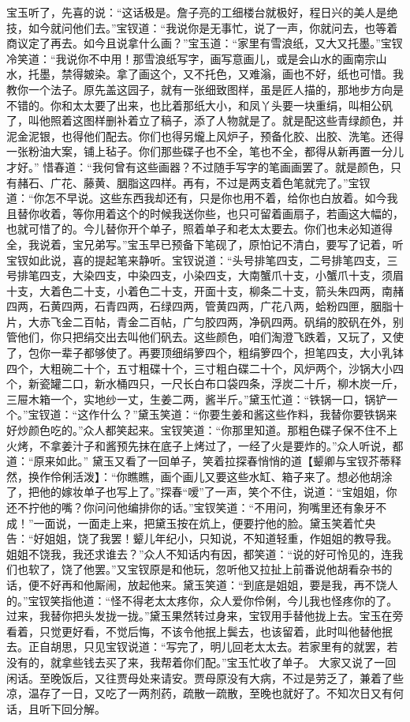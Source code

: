 \documentclass[12pt,oneside]{book}
\begin{document}
宝玉听了，先喜的说：“这话极是。詹子亮的工细楼台就极好，程日兴的美人是绝技，如今就问他们去。”宝钗道：“我说你是无事忙，说了一声，你就问去，也等着商议定了再去。如今且说拿什么画？”宝玉道：“家里有雪浪纸，又大又托墨。”宝钗冷笑道：“我说你不中用！那雪浪纸写字，画写意画儿，或是会山水的画南宗山水，托墨，禁得皴染。拿了画这个，又不托色，又难滃，画也不好，纸也可惜。我教你一个法子。原先盖这园子，就有一张细致图样，虽是匠人描的，那地步方向是不错的。你和太太要了出来，也比着那纸大小，和凤丫头要一块重绢，叫相公矾了，叫他照着这图样删补着立了稿子，添了人物就是了。就是配这些青绿颜色，并泥金泥银，也得他们配去。你们也得另爖上风炉子，预备化胶、出胶、洗笔。还得一张粉油大案，铺上毡子。你们那些碟子也不全，笔也不全，都得从新再置一分儿才好。”
惜春道：“我何曾有这些画器？不过随手写字的笔画画罢了。就是颜色，只有赭石、广花、藤黄、胭脂这四样。再有，不过是两支着色笔就完了。”宝钗道：“你怎不早说。这些东西我却还有，只是你也用不着，给你也白放着。如今我且替你收着，等你用着这个的时候我送你些，也只可留着画扇子，若画这大幅的，也就可惜了的。今儿替你开个单子，照着单子和老太太要去。你们也未必知道得全，我说着，宝兄弟写。”宝玉早已预备下笔砚了，原怕记不清白，要写了记着，听宝钗如此说，喜的提起笔来静听。宝钗说道：“头号排笔四支，二号排笔四支，三号排笔四支，大染四支，中染四支，小染四支，大南蟹爪十支，小蟹爪十支，须眉十支，大着色二十支，小着色二十支，开面十支，柳条二十支，箭头朱四两，南赭四两，石黄四两，石青四两，石绿四两，管黄四两，广花八两，蛤粉四匣，胭脂十片，大赤飞金二百帖，青金二百帖，广匀胶四两，净矾四两。矾绢的胶矾在外，别管他们，你只把绢交出去叫他们矾去。这些颜色，咱们淘澄飞跌着，又玩了，又使了，包你一辈子都够使了。再要顶细绢箩四个，粗绢箩四个，担笔四支，大小乳钵四个，大粗碗二十个，五寸粗碟十个，三寸粗白碟二十个，风炉两个，沙锅大小四个，新瓷罐二口，新水桶四只，一尺长白布口袋四条，浮炭二十斤，柳木炭一斤，三屉木箱一个，实地纱一丈，生姜二两，酱半斤。”黛玉忙道：“铁锅一口，锅铲一个。”宝钗道：“这作什么？”黛玉笑道：“你要生姜和酱这些作料，我替你要铁锅来好炒颜色吃的。”众人都笑起来。宝钗笑道：“你那里知道。那粗色碟子保不住不上火烤，不拿姜汁子和酱预先抹在底子上烤过了，一经了火是要炸的。”众人听说，都道：“原来如此。”
黛玉又看了一回单子，笑着拉探春悄悄的道【颦卿与宝钗芥蒂释然，换作伶俐活泼】：“你瞧瞧，画个画儿又要这些水缸、箱子来了。想必他胡涂了，把他的嫁妆单子也写上了。”探春“嗳”了一声，笑个不住，说道：“宝姐姐，你还不拧他的嘴？你问问他编排你的话。”宝钗笑道：“不用问，狗嘴里还有象牙不成！”一面说，一面走上来，把黛玉按在炕上，便要拧他的脸。黛玉笑着忙央告：“好姐姐，饶了我罢！颦儿年纪小，只知说，不知道轻重，作姐姐的教导我。姐姐不饶我，我还求谁去？”众人不知话内有因，都笑道：“说的好可怜见的，连我们也软了，饶了他罢。”又宝钗原是和他玩，忽听他又拉扯上前番说他胡看杂书的话，便不好再和他厮闹，放起他来。黛玉笑道：“到底是姐姐，要是我，再不饶人的。”宝钗笑指他道：“怪不得老太太疼你，众人爱你伶俐，今儿我也怪疼你的了。过来，我替你把头发拢一拢。”黛玉果然转过身来，宝钗用手替他拢上去。宝玉在旁看着，只觉更好看，不觉后悔，不该令他抿上鬓去，也该留着，此时叫他替他抿去。正自胡思，只见宝钗说道：“写完了，明儿回老太太去。若家里有的就罢，若没有的，就拿些钱去买了来，我帮着你们配。”宝玉忙收了单子。
大家又说了一回闲话。至晚饭后，又往贾母处来请安。贾母原没有大病，不过是劳乏了，兼着了些凉，温存了一日，又吃了一两剂药，疏散一疏散，至晚也就好了。不知次日又有何话，且听下回分解。
\end{document}
